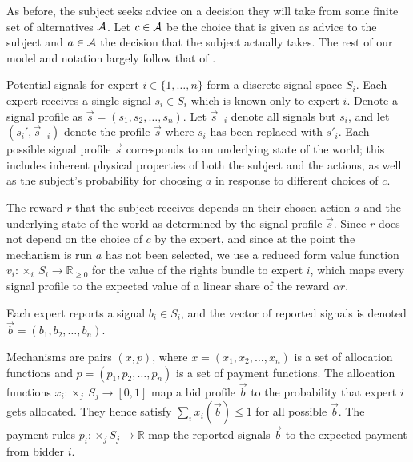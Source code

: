 As before, the subject seeks advice on a decision they will take from some finite set of alternatives ${\mathcal A}$. Let $c\in{\mathcal A}$ be the choice that is given as advice to the subject and $a\in{\mathcal A}$ the decision that the subject actually takes.
The rest of our model and notation largely follow that of \citep{eden2018interdependent}. %

Potential signals for expert $i \in \{1, \ldots, n\}$ form a discrete signal space $S_i$.
Each expert receives a single signal $s_i\in S_i$ which is known only to expert $i$.
Denote a signal profile as $\vec{s}=(s_1,s_2,\ldots,s_n)$.
Let $\vec{s}_{-i}$ denote all signals but $s_i$, and let $(s_i',\vec{s}_{-i})$ denote the profile $\vec{s}$ where $s_i$ has been replaced with $s'_i$.
Each possible signal profile $\vec{s}$ corresponds to an underlying state of the world; this includes inherent physical properties of both the subject and the actions, as well as the subject's probability for choosing $a$ in response to different choices of $c$.

The reward $r$ that the subject receives depends on their chosen action $a$ and the underlying state of the world as determined by the signal profile $\vec{s}$.
Since $r$ does not depend on the choice of $c$ by the expert, and since at the point the mechanism is run $a$ has not been selected, we use a reduced form  value function $v_i: \times_i \ S_i \rightarrow \mathbb{R}_{\geq 0}$ for the value of the rights bundle to expert $i$, which maps every signal profile to the expected value of a linear share of the reward  $\alpha r$.


Each expert reports a signal $b_i\in S_i$, and the vector of reported signals is denoted $\vec{b}=( b_1, b_2, \ldots, b_n)$.

Mechanisms are pairs $(x,p)$, where $x=(x_1,x_2,\ldots,x_n)$ is a set of allocation functions and $p=(p_1,p_2,\ldots,p_n)$ is a set of payment functions.
The allocation functions $x_i:\times_j \ S_j\rightarrow [0,1]$ map a bid profile $\vec{b}$ to the probability that expert $i$ gets allocated. They hence satisfy $\sum_i x_i(\vec{b}) \leq 1$ for all possible $\vec{b}$.
The payment rules $p_i: \times _j S_j \rightarrow \mathbb R$ map the reported signals $\vec{b}$ to the expected payment from bidder $i$.

